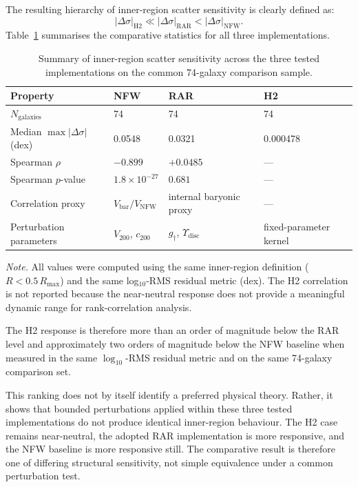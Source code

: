 \documentclass[fleqn,usenatbib]{mnras}
\begin{document}
The resulting hierarchy of inner-region scatter sensitivity is clearly defined as:
\begin{equation}
	|\Delta\sigma|_{\mathrm{H2}} \ll |\Delta\sigma|_{\mathrm{RAR}} < |\Delta\sigma|_{\mathrm{NFW}}.
\end{equation}
Table~\ref{tab:summary} summarises the comparative statistics for all three implementations.
\begin{table}
	\caption{Summary of inner-region scatter sensitivity across the three
		tested implementations on the common 74-galaxy comparison sample.}
	\label{tab:summary}
	\centering
	\scriptsize
	\setlength{\tabcolsep}{3pt}
	\begin{tabular}{p{}p{}p{}p{}}
		\toprule
		Property & NFW & RAR & H2 \\
		\midrule
		$N_{\mathrm{galaxies}}$ & 74 & 74 & 74 \\
		Median $\max|\Delta\sigma|$ (dex) & 0.0548 & 0.0321 & 0.000478 \\
		Spearman $\rho$ & $-0.899$ & $+0.0485$ & --- \\
		Spearman $p$-value & $1.8\times10^{-27}$ & $0.681$ & --- \\
		Correlation proxy & $V_{\mathrm{bar}}/V_{\mathrm{NFW}}$ & internal baryonic proxy & --- \\
		Perturbation parameters & $V_{200}$, $c_{200}$ & $g_{\dagger}$, $\Upsilon_{\mathrm{disc}}$ & fixed-parameter kernel \\
		\bottomrule
	\end{tabular}
	
	\vspace{2pt}
	\parbox{\columnwidth}{\footnotesize \textit{Note.} All values were computed using the same inner-region definition ($R < 0.5\,R_{\max}$) and the same log$_{10}$-RMS residual metric (dex). The H2 correlation is not reported because the near-neutral response does not provide a meaningful dynamic range for rank-correlation analysis.}
\end{table}
The H2 response is therefore more than an order of magnitude below the RAR level and approximately two orders of magnitude below the NFW baseline when measured in the same $\log_{10}$-RMS residual metric and on the same 74-galaxy comparison set.

This ranking does not by itself identify a preferred physical theory. Rather, it shows that bounded perturbations applied within these three tested implementations do not produce identical inner-region behaviour. The H2 case remains near-neutral, the adopted RAR implementation is more responsive, and the NFW baseline is more responsive still. The comparative result is therefore one of differing structural sensitivity, not simple equivalence under a common perturbation test.
\end{document}

